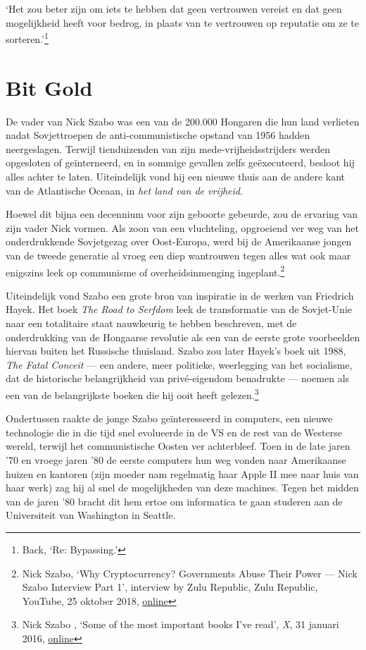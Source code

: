 \documentclass[smalldemyvopaper,11pt,twoside,onecolumn,openright,extrafontsizes,hidelinks]{memoir}
\begin{document}
`Het zou beter zijn om iets te hebben dat geen vertrouwen vereist en dat
geen mogelijkheid heeft voor bedrog, in plaats van te vertrouwen op
reputatie om ze te sorteren.'\footnote{Back, `Re: Bypassing.'}

\chapter{Bit Gold}\label{bit-gold}

De vader van Nick Szabo was een van de 200.000 Hongaren die hun land
verlieten nadat Sovjettroepen de anti-communistische opstand van 1956
hadden neergeslagen. Terwijl tienduizenden van zijn
mede-vrijheidsstrijders werden opgesloten of geïnterneerd, en in sommige
gevallen zelfs geëxecuteerd, besloot hij alles achter te laten.
Uiteindelijk vond hij een nieuwe thuis aan de andere kant van de
Atlantische Oceaan, in \emph{het land van de vrijheid}.

Hoewel dit bijna een decennium voor zijn geboorte gebeurde, zou de
ervaring van zijn vader Nick vormen. Als zoon van een vluchteling,
opgroeiend ver weg van het onderdrukkende Sovjetgezag over Oost-Europa,
werd bij de Amerikaanse jongen van de tweede generatie al vroeg een diep
wantrouwen tegen alles wat ook maar enigszins leek op communisme of
overheidsinmenging ingeplant.\footnote{Nick Szabo, `Why Cryptocurrency?
  Governments Abuse Their Power --- Nick Szabo Interview Part 1',
  interview by Zulu Republic, Zulu Republic, YouTube, 25 oktober 2018,
  \href{https://www.youtube.com/watch?v=LZw4LNLYUgc}{online}}

Uiteindelijk vond Szabo een grote bron van inspiratie in de werken van
Friedrich Hayek. Het boek \emph{The Road to Serfdom} leek de
transformatie van de Sovjet-Unie naar een totalitaire staat nauwkeurig
te hebben beschreven, met de onderdrukking van de Hongaarse revolutie
als een van de eerste grote voorbeelden hiervan buiten het Russische
thuisland. Szabo zou later Hayek's boek uit 1988, \emph{The Fatal
Conceit} --- een andere, meer politieke, weerlegging van het socialisme,
dat de historische belangrijkheid van privé-eigendom benadrukte ---
noemen als een van de belangrijkste boeken die hij ooit heeft
gelezen.\footnote{Nick Szabo , `Some of the most important books I've
  read', \emph{X}, 31 januari 2016,
  \href{https://x.com/NickSzabo4/status/693682157525401601}{online}}

Ondertussen raakte de jonge Szabo geïnteresseerd in computers, een
nieuwe technologie die in die tijd snel evolueerde in de VS en de rest
van de Westerse wereld, terwijl het communistische Oosten ver
achterbleef. Toen in de late jaren '70 en vroege jaren '80 de eerste
computers hun weg vonden naar Amerikaanse huizen en kantoren (zijn
moeder nam regelmatig haar Apple II mee naar huis van haar werk) zag hij
al snel de mogelijkheden van deze machines. Tegen het midden van de
jaren '80 bracht dit hem ertoe om informatica te gaan studeren aan de
Universiteit van Washington in Seattle.
\end{document}
